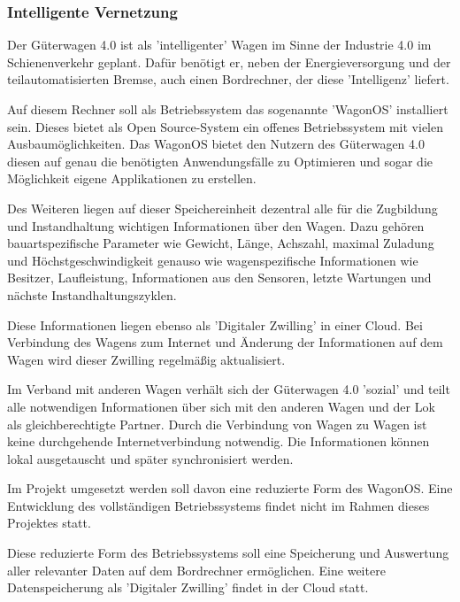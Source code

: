 \subsubsection{Intelligente Vernetzung}
Der Güterwagen 4.0 ist als 'intelligenter' Wagen im Sinne der Industrie 4.0 im Schienenverkehr geplant. Dafür benötigt er, neben der Energieversorgung und der teilautomatisierten Bremse, auch einen Bordrechner, der diese 'Intelligenz' liefert.\par
Auf diesem Rechner soll als Betriebssystem das sogenannte '\gls{WagonOS}' installiert sein. Dieses bietet als Open Source-System ein offenes Betriebssystem mit vielen Ausbaumöglichkeiten. Das \gls{WagonOS} bietet den Nutzern des Güterwagen 4.0  diesen auf genau die benötigten Anwendungsfälle zu Optimieren und sogar die Möglichkeit eigene Applikationen zu erstellen.\par
Des Weiteren liegen auf dieser Speichereinheit dezentral alle für die Zugbildung und Instandhaltung wichtigen Informationen über den Wagen. Dazu gehören bauartspezifische Parameter wie Gewicht, Länge, Achszahl, maximal Zuladung und Höchstgeschwindigkeit genauso wie wagenspezifische Informationen wie Besitzer, Laufleistung, Informationen aus den Sensoren, letzte Wartungen und nächste Instandhaltungszyklen.\par
Diese Informationen liegen ebenso als 'Digitaler Zwilling' in einer Cloud. Bei Verbindung des Wagens zum Internet und Änderung der Informationen auf dem Wagen wird dieser Zwilling regelmäßig aktualisiert.\par
Im Verband mit anderen Wagen verhält sich der Güterwagen 4.0 'sozial' und teilt alle notwendigen Informationen über sich mit den anderen Wagen und der Lok als gleichberechtigte Partner. Durch die Verbindung von Wagen zu Wagen ist keine durchgehende Internetverbindung notwendig. Die Informationen können lokal ausgetauscht und später synchronisiert werden.\par
Im Projekt umgesetzt werden soll davon eine reduzierte Form des \gls{WagonOS}. Eine Entwicklung des vollständigen Betriebssystems findet nicht im Rahmen dieses Projektes statt.\par
Diese reduzierte Form des Betriebssystems soll eine Speicherung und Auswertung aller relevanter Daten auf dem Bordrechner ermöglichen. Eine weitere Datenspeicherung als 'Digitaler Zwilling' findet in der Cloud statt.



